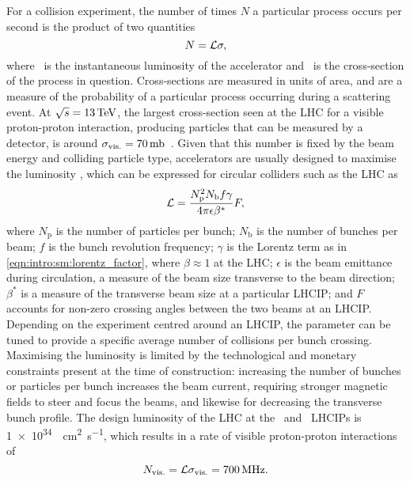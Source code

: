 For a collision experiment, the number of times $N$ a particular process occurs 
per second is the product of two quantities
\begin{equation}
  N = \mathcal{L}\sigma,
  \label{eqn:intro:lhc:lumi_xsec}
\end{equation}
where \lumi\ is the instantaneous luminosity of the accelerator and \xsec\ is 
the cross-section of the process in question.
Cross-sections are measured in units of area, and are a measure of the 
probability of a particular process occurring during a scattering event.
At $\sqrts = \SI{13}{\TeV}$, the largest cross-section seen at the \ac{LHC} for 
a visible proton-proton interaction, producing particles that can be measured 
by a detector, is around $\xsecppvis = 
\SI{70}{\milli\barn}$~\cite{Aaboud:2016mmw,CMS:2016ael}.
Given that this number is fixed by the beam energy and colliding particle type, 
accelerators are usually designed to maximise the luminosity \lumi, which can 
be expressed for circular colliders such as the \ac{LHC} as
\begin{equation}
  \mathcal{L} = \frac{N_{\text{p}}^{2}N_{\text{b}}f\gamma}{4\pi\epsilon\beta^{*}}F,
\end{equation}
where $N_{\text{p}}$ is the number of particles per bunch; $N_{\text{b}}$ is 
the number of bunches per beam; $f$ is the bunch revolution frequency; $\gamma$ 
is the Lorentz term as in \cref{eqn:intro:sm:lorentz_factor}, where $\beta 
\approx 1$ at the \ac{LHC}; $\epsilon$ is the beam emittance during 
circulation, a measure of the beam size transverse to the beam direction; 
$\beta^{*}$ is a measure of the transverse beam size at a particular 
\ac{LHCIP}; and $F$ accounts for non-zero crossing angles between the two beams 
at an \ac{LHCIP}.
Depending on the experiment centred around an \ac{LHCIP}, the \betastar 
parameter can be tuned to provide a specific average number of collisions per 
bunch crossing.
Maximising the luminosity is limited by the technological and monetary 
constraints present at the time of construction: increasing the number of 
bunches or particles per bunch increases the beam current, requiring stronger 
magnetic fields to steer and focus the beams, and likewise for decreasing the 
transverse bunch profile.
The design luminosity of the \ac{LHC} at the \atlas\ and \cms\ \acp{LHCIP} is
\SI{1e34}{\per\square\centi\metre\per\second}, which results in a rate of 
visible proton-proton interactions of
\begin{equation}
  N_{\text{vis.}} = \mathcal{L}\sigma_{\text{vis.}}
                  = \SI{700}{\mega\hertz}.
  \label{eqn:intro:lhc:nppvis}
\end{equation}


